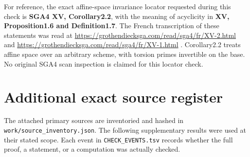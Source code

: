 \documentclass[
  10pt,
]{article}
\begin{document}
For reference, the exact affine-space invariance locator requested
during this check is \textbf{SGA4 XV, Corollary2.2}, with the meaning of
acyclicity in \textbf{XV, Proposition1.6 and Definition1.7}. The French
transcription of these statements was read at
\url{https://grothendiecksga.com/read/sga4/fr/XV-2.html} and
\url{https://grothendiecksga.com/read/sga4/fr/XV-1.html} . Corollary2.2
treats affine space over an arbitrary scheme, with torsion primes
invertible on the base. No original SGA4 scan inspection is claimed for
this locator check.

\section{Additional exact source
register}\label{additional-exact-source-register}

The attached primary sources are inventoried and hashed in
\texttt{\small work/\allowbreak{}source\_\allowbreak{}inventory.json}.
The following supplementary results were used at their stated scope.
Each event in \texttt{\small CHECK\_\allowbreak{}EVENTS.tsv} records
whether the full proof, a statement, or a computation was actually
checked.
\end{document}
